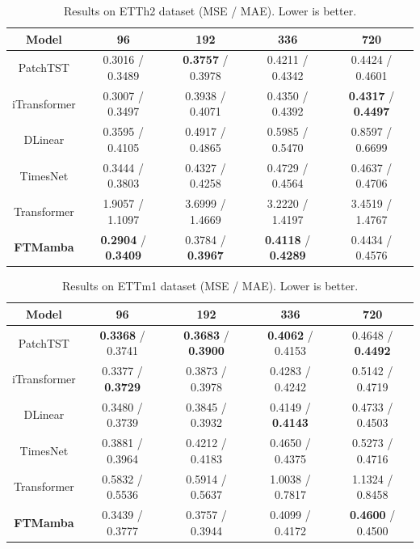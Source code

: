 \documentclass[electronics,article,submit,pdftex,moreauthors]{Definitions/mdpi}
\begin{document}
\begin{table}[H]
\caption{Results on ETTh2 dataset (MSE / MAE). Lower is better.\label{tab:etth2}}
\begin{tabularx}{\textwidth}{CCCCC}
\toprule
\textbf{Model} & \textbf{96} & \textbf{192} & \textbf{336} & \textbf{720} \\
\midrule
PatchTST     & 0.3016 / 0.3489  & \textbf{0.3757} / 0.3978 & 0.4211 / 0.4342  & 0.4424 / 0.4601  \\
iTransformer & 0.3007 / 0.3497  & 0.3938 / 0.4071  & 0.4350 / 0.4392  & \textbf{0.4317} / \textbf{0.4497} \\
DLinear      & 0.3595 / 0.4105  & 0.4917 / 0.4865  & 0.5985 / 0.5470  & 0.8597 / 0.6699  \\
TimesNet     & 0.3444 / 0.3803  & 0.4327 / 0.4258  & 0.4729 / 0.4564  & 0.4637 / 0.4706  \\
Transformer  & 1.9057 / 1.1097  & 3.6999 / 1.4669  & 3.2220 / 1.4197  & 3.4519 / 1.4767  \\
\textbf{FTMamba}  & \textbf{0.2904} / \textbf{0.3409} & 0.3784 / \textbf{0.3967} & \textbf{0.4118} / \textbf{0.4289} & 0.4434 / 0.4576  \\
\bottomrule
\end{tabularx}
\end{table}

\begin{table}[H]
\caption{Results on ETTm1 dataset (MSE / MAE). Lower is better.\label{tab:ettm1}}
\begin{tabularx}{\textwidth}{CCCCC}
\toprule
\textbf{Model} & \textbf{96} & \textbf{192} & \textbf{336} & \textbf{720} \\
\midrule
PatchTST     & \textbf{0.3368} / 0.3741  & \textbf{0.3683} / \textbf{0.3900} & \textbf{0.4062} / 0.4153  & 0.4648 / \textbf{0.4492} \\
iTransformer & 0.3377 / \textbf{0.3729} & 0.3873 / 0.3978  & 0.4283 / 0.4242  & 0.5142 / 0.4719  \\
DLinear      & 0.3480 / 0.3739  & 0.3845 / 0.3932  & 0.4149 / \textbf{0.4143} & 0.4733 / 0.4503  \\
TimesNet     & 0.3881 / 0.3964  & 0.4212 / 0.4183  & 0.4650 / 0.4375  & 0.5273 / 0.4716  \\
Transformer  & 0.5832 / 0.5536  & 0.5914 / 0.5637  & 1.0038 / 0.7817  & 1.1324 / 0.8458  \\
\textbf{FTMamba}  & 0.3439 / 0.3777  & 0.3757 / 0.3944  & 0.4099 / 0.4172  & \textbf{0.4600} / 0.4500  \\
\bottomrule
\end{tabularx}
\end{table}
\end{document}
